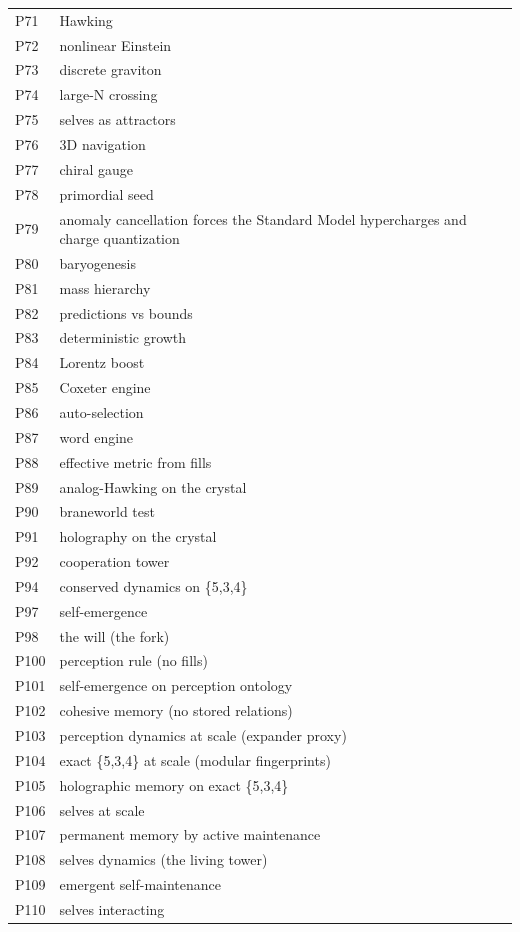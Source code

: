 \begin{small}
\begin{longtable}{p{0.7cm}p{13.5cm}}
P71 & Hawking \\
P72 & nonlinear Einstein \\
P73 & discrete graviton \\
P74 & large-N crossing \\
P75 & selves as attractors \\
P76 & 3D navigation \\
P77 & chiral gauge \\
P78 & primordial seed \\
P79 & anomaly cancellation forces the Standard Model hypercharges and charge quantization \\
P80 & baryogenesis \\
P81 & mass hierarchy \\
P82 & predictions vs bounds \\
P83 & deterministic growth \\
P84 & Lorentz boost \\
P85 & Coxeter engine \\
P86 & auto-selection \\
P87 & word engine \\
P88 & effective metric from fills \\
P89 & analog-Hawking on the crystal \\
P90 & braneworld test \\
P91 & holography on the crystal \\
P92 & cooperation tower \\
P94 & conserved dynamics on \{5,3,4\} \\
P97 & self-emergence \\
P98 & the will (the fork) \\
P100 & perception rule (no fills) \\
P101 & self-emergence on perception ontology \\
P102 & cohesive memory (no stored relations) \\
P103 & perception dynamics at scale (expander proxy) \\
P104 & exact \{5,3,4\} at scale (modular fingerprints) \\
P105 & holographic memory on exact \{5,3,4\} \\
P106 & selves at scale \\
P107 & permanent memory by active maintenance \\
P108 & selves dynamics (the living tower) \\
P109 & emergent self-maintenance \\
P110 & selves interacting \\

\end{longtable}
\end{small}
